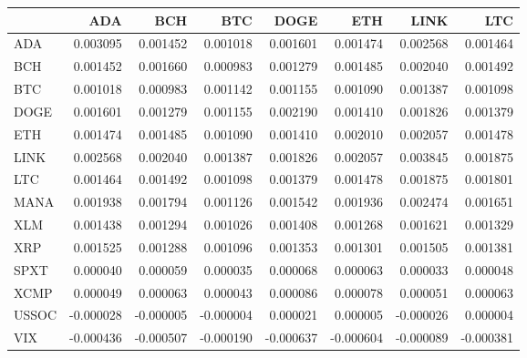 \begin{tabular}{lrrrrrrr}
\toprule
 & ADA & BCH & BTC & DOGE & ETH & LINK & LTC \\
\midrule
ADA & 0.003095 & 0.001452 & 0.001018 & 0.001601 & 0.001474 & 0.002568 & 0.001464 \\
BCH & 0.001452 & 0.001660 & 0.000983 & 0.001279 & 0.001485 & 0.002040 & 0.001492 \\
BTC & 0.001018 & 0.000983 & 0.001142 & 0.001155 & 0.001090 & 0.001387 & 0.001098 \\
DOGE & 0.001601 & 0.001279 & 0.001155 & 0.002190 & 0.001410 & 0.001826 & 0.001379 \\
ETH & 0.001474 & 0.001485 & 0.001090 & 0.001410 & 0.002010 & 0.002057 & 0.001478 \\
LINK & 0.002568 & 0.002040 & 0.001387 & 0.001826 & 0.002057 & 0.003845 & 0.001875 \\
LTC & 0.001464 & 0.001492 & 0.001098 & 0.001379 & 0.001478 & 0.001875 & 0.001801 \\
MANA & 0.001938 & 0.001794 & 0.001126 & 0.001542 & 0.001936 & 0.002474 & 0.001651 \\
XLM & 0.001438 & 0.001294 & 0.001026 & 0.001408 & 0.001268 & 0.001621 & 0.001329 \\
XRP & 0.001525 & 0.001288 & 0.001096 & 0.001353 & 0.001301 & 0.001505 & 0.001381 \\
SPXT & 0.000040 & 0.000059 & 0.000035 & 0.000068 & 0.000063 & 0.000033 & 0.000048 \\
XCMP & 0.000049 & 0.000063 & 0.000043 & 0.000086 & 0.000078 & 0.000051 & 0.000063 \\
USSOC & -0.000028 & -0.000005 & -0.000004 & 0.000021 & 0.000005 & -0.000026 & 0.000004 \\
VIX & -0.000436 & -0.000507 & -0.000190 & -0.000637 & -0.000604 & -0.000089 & -0.000381 \\
\bottomrule
\end{tabular}
